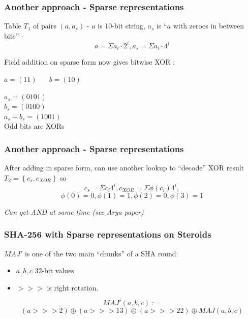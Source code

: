 \documentclass[shadesubsections,compress,14pt,mathserif]{beamer}
\newcommand{\set}[1]{\ensuremath{\left\{#1\right\}}}
\begin{document}
\begin{frame}
\frametitle{Another approach - Sparse representations }   
Table $T_1$ of pairs $(a,a_s)$ - $a$ is 10-bit string, $a_s$ is ``$a$ with zeroes in between bits'' - 
\begin{equation}
a=  \Sigma a_i \cdot 2^i, a_s =  \Sigma a_i \cdot 4^i
\end{equation}\pause

Field addition on sparse form now gives bitwise XOR :

$a=(1 1) $
$\;\;\;\;\;b=(1 0) $\\ \pause

$a_s = (0 1 0 1)$\\
$b_s = (0 1 0 0)$\\ \pause
\vspace{0.2in}
$a_s + b_s = (1 0 0 1)$\\ \pause
Odd bits are XORs
\end{frame}
\begin{frame}
\frametitle{Another approach - Sparse representations}   %
After adding in sparse form, can use another lookup to ``decode'' XOR result
$T_2 = \set{c_s,c_{XOR}}$ so
\[c_s=\Sigma  c_i 4^i, c_{XOR}=\Sigma \phi(c_i) 4^i,\]
\[\phi(0)=0,\phi(1)=1,\phi(2)=0,\phi(3)=1\]\pause

\vspace{0.4in}
{\small \textit{Can get AND at same time (see Arya paper)}}
\end{frame}
\begin{frame}
\frametitle{SHA-256 with Sparse representations on Steroids }   
\end{frame}
\begin{frame}
$MAJ'$ is one of the two main ``chunks'' of a SHA round:
\begin{itemize}
 \item $a,b,c$ 32-bit values 
\item $>>>$ is right rotation.\pause
\end{itemize}
\vspace{0.2in}
\[MAJ'(a,b,c) :=\]
\[(a >>> 2) \oplus (a >>>13) \oplus (a>>> 22) \oplus MAJ(a,b,c)\]\pause

\end{frame}
\end{document}
